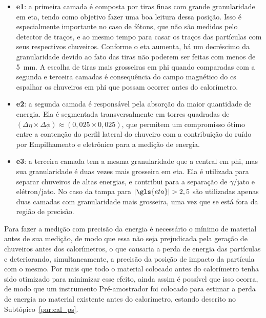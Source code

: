 \begin{itemize}
\item \textbf{\gls{e1}}: a primeira camada é composta por tiras
finas com grande granularidade em \gls{eta}, tendo como objetivo fazer uma
boa leitura dessa posição. Isso é especialmente importante no caso de fótons,
que não são medidos pelo detector de traços, e ao mesmo tempo para casar os
traços das partículas com seus respectivos chuveiros. Conforme o \gls{eta} aumenta,
há um decréscimo da granularidade devido ao fato das tiras não poderem ser feitas com menos de 5~mm.
A escolha de tiras mais grosseiras em \gls{phi} quando comparadas com a segunda e 
terceira camadas é consequência do campo magnético do \gls{cs} espalhar os
chuveiros em \gls{phi} que possam ocorrer antes do calorímetro.


\item \textbf{\gls{e2}}: a segunda camada é responsável pela
absorção da maior quantidade de energia. Ela é segmentada transversalmente em
torres quadradas de $(\Delta\eta\times\Delta\phi)\approx(0,025\times0,025)$, que
permitem um compromisso ótimo entre a contenção do perfil lateral do chuveiro
com a contribuição do ruído por Empilhamento e eletrônico para a medição de
energia.

\item \textbf{\gls{e3}}: a terceira camada tem a mesma
granularidade que a central em \gls{phi}, mas sua granularidade é duas vezes mais grosseira
em \gls{eta}. Ela é utilizada para separar chuveiros de altas energias, e
contribui para a separação de $\gamma/$jato e elétron/jato. No caso da tampa
para $|\gls{eta}|>2,5$ são utilizadas apenas duas camadas com granularidade mais
grosseira, uma vez que se está fora da região de precisão.
\end{itemize}

Para fazer a medição com precisão da energia é necessário o mínimo de material 
antes de sua medição, de modo que essa não seja prejudicada pela geração de
chuveiros antes dos calorímetros, o que causaria a perda de energia das
partículas e deteriorando, simultaneamente, a precisão da posição de impacto 
da partícula com o mesmo. Por mais que todo o material colocado antes do
calorímetro tenha sido otimizado para minimizar esse efeito, ainda assim é
possível que isso ocorra, de modo que um instrumento Pré-amostrador foi colocado 
para estimar a perda de energia no material existente antes do calorímetro, 
estando descrito no Subtópico~\ref{par:cal_ps}.



